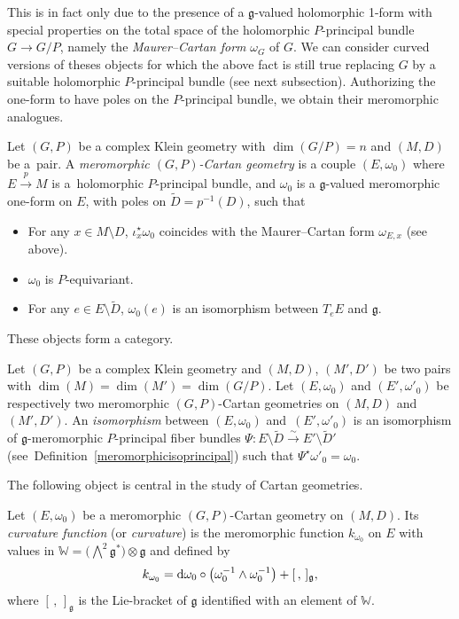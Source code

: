 \documentclass[pdftex]{sigma}
\numberwithin{equation}{section}
\begin{document}
 This is in fact only due to the presence of a $\mathfrak{g}$-valued holomorphic 1-form with special properties on the total space of the holomorphic $P$-principal bundle $G\longrightarrow G/P$, namely the \textit{Maurer--Cartan form} $\omega_G$ of $G$. We can consider curved versions of theses objects for which the above fact is still true replacing $G$ by a suitable holomorphic $P$-principal bundle (see next subsection). Authorizing the one-form to have poles on the $P$-principal bundle, we obtain their meromorphic analogues.

\begin{Definition}\label{Cartan} Let $(G,P)$ be a complex Klein geometry with $\dim(G/P)=n$ and $(M,D)$ be a~pair. A \textit{meromorphic $(G,P)$-Cartan geometry} is a couple $(E,\omega_0)$ where $E\overset{p}{\to}M$ is a~holomorphic $P$-principal bundle, and $\omega_0$ is a $\mathfrak{g}$-valued meromorphic one-form on $E$, with poles on $\tilde{D}=p^{-1}(D)$, such that
\begin{itemize}\itemsep=0pt
\item[(i)] For any $x\in M\setminus D$, $\iota_x^\star \omega_0$ coincides with the Maurer--Cartan form $\omega_{E,x}$ (see above).
\item [(ii)]$\omega_0$ is $P$-equivariant.
\item[(iii)] For any $e\in E\setminus \tilde{D}$, $\omega_0(e)$ is an isomorphism between $T_e E$ and $\mathfrak{g}$.
\end{itemize}
\end{Definition}
These objects form a category.

\begin{Definition}\label{isoCartan} Let $(G,P)$ be a complex Klein geometry and $(M,D)$, $(M',D')$ be two pairs with $\dim(M)=\dim(M')=\dim(G/P)$. Let $(E,\omega_0)$ and $(E',\omega'_0)$ be respectively two meromorphic $(G,P)$-Cartan geometries on $(M,D)$ and~$(M',D')$. An \textit{isomorphism} between $(E,\omega_0)$ and~$(E',\omega'_0)$ is an isomorphism of $\mathfrak{g}$-meromorphic $P$-principal fiber bundles $\Psi\colon E\setminus \tilde{D} \overset{\sim}{\to} E' \setminus \tilde{D}'$ (see~Definition~\ref{meromorphicisoprincipal}) such that $\Psi^\star \omega'_0 = \omega_0$. \end{Definition}
The following object is central in the study of Cartan geometries.

\begin{Definition}\label{curvature} Let $(E,\omega_0)$ be a meromorphic $(G,P)$-Cartan geometry on $(M,D)$. Its \textit{curvature function} (or \textit{curvature}) is the meromorphic function $k_{\omega_0}$ on $E$ with values in $\mathbb{W}=\bigl(\bigwedge^2 \mathfrak{g}^*\bigr)\otimes \mathfrak{g}$ and defined by
\[k_{\omega_0} = {\rm d}\omega_0 \circ \big(\omega_0^{-1} \wedge \omega_0^{-1}\big) + [\,,\,]_{\mathfrak{g}}, \]
where $[\,,\,]_\mathfrak{g}$ is the Lie-bracket of $\mathfrak{g}$ identified with an element of $\mathbb{W}$. \end{Definition}
\end{document}
